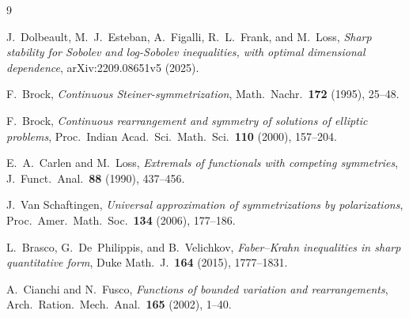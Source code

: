 \documentclass[11pt]{article}
\theoremstyle{definition}
\begin{document}
\begin{thebibliography}{9}

 J.~Dolbeault, M.~J.~Esteban, A.~Figalli, R.~L.~Frank, and
M.~Loss, \emph{Sharp stability for Sobolev and log-Sobolev inequalities,
with optimal dimensional dependence}, arXiv:2209.08651v5 (2025).

 F.~Brock, \emph{Continuous Steiner-symmetrization},
Math.~Nachr.\ \textbf{172} (1995), 25--48.

 F.~Brock, \emph{Continuous rearrangement and symmetry of
solutions of elliptic problems}, Proc.~Indian Acad.~Sci.\ Math.~Sci.\
\textbf{110} (2000), 157--204.

 E.~A.~Carlen and M.~Loss, \emph{Extremals of
functionals with competing symmetries}, J.~Funct.~Anal.\ \textbf{88} (1990),
437--456.

 J.~Van Schaftingen, \emph{Universal approximation of
symmetrizations by polarizations}, Proc.~Amer.~Math.~Soc.\ \textbf{134}
(2006), 177--186.

 L.~Brasco, G.~De~Philippis, and B.~Velichkov, \emph{Faber--Krahn
inequalities in sharp quantitative form}, Duke Math.~J.\ \textbf{164}
(2015), 1777--1831.

 A.~Cianchi and N.~Fusco, \emph{Functions of bounded
variation and rearrangements}, Arch.~Ration.~Mech.~Anal.\ \textbf{165}
(2002), 1--40.

\end{thebibliography}
\end{document}
